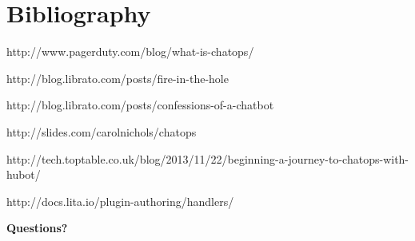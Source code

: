 \documentclass[
paper=128mm:96mm, %
fontsize=11pt, %
pagesize, %
parskip=half-, %
]{scrartcl} %
\theoremstyle{mythmstyle} %
\newtheorem{remark}[theorem]{Remark} %
\newtheorem{algorithm}[theorem]{Algorithm} %
\begin{document}










\thispagestyle{empty} %

\section{Bibliography}


http://www.pagerduty.com/blog/what-is-chatops/

http://blog.librato.com/posts/fire-in-the-hole

http://blog.librato.com/posts/confessions-of-a-chatbot

http://slides.com/carolnichols/chatops

http://tech.toptable.co.uk/blog/2013/11/22/beginning-a-journey-to-chatops-with-hubot/

http://docs.lita.io/plugin-authoring/handlers/


\clearpage


\thispagestyle{empty} %

\begin{flushright}
\vspace{0.6cm}
\color{white}\sffamily
{\bfseries\LARGE Questions?\par} %
\vfill
\end{flushright}
\end{document}
